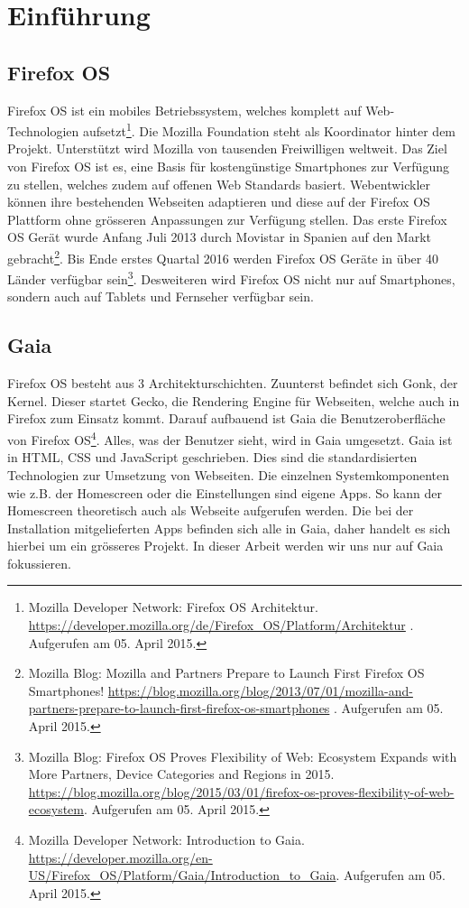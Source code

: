 \chapter{Einführung}

\section{Firefox OS}
Firefox OS ist ein mobiles Betriebssystem, welches komplett auf Web-Technologien aufsetzt\footnote{Mozilla Developer Network: Firefox OS Architektur. \url{https://developer.mozilla.org/de/Firefox_OS/Platform/Architektur} . Aufgerufen am 05. April 2015.}. Die Mozilla Foundation steht als Koordinator hinter dem Projekt. Unterstützt wird Mozilla von tausenden Freiwilligen weltweit. Das Ziel von Firefox OS ist es, eine Basis für kostengünstige Smartphones zur Verfügung zu stellen, welches zudem auf offenen Web Standards basiert. Webentwickler können ihre bestehenden Webseiten adaptieren und diese auf der Firefox OS Plattform ohne grösseren Anpassungen zur Verfügung stellen. Das erste Firefox OS Gerät wurde Anfang Juli 2013 durch Movistar in Spanien auf den Markt gebracht\footnote{Mozilla Blog: Mozilla and Partners Prepare to Launch First Firefox OS Smartphones! \url{https://blog.mozilla.org/blog/2013/07/01/mozilla-and-partners-prepare-to-launch-first-firefox-os-smartphones} . Aufgerufen am 05. April 2015.}. Bis Ende erstes Quartal 2016 werden Firefox OS Geräte in über 40 Länder verfügbar sein\footnote{Mozilla Blog: Firefox OS Proves Flexibility of Web: Ecosystem Expands with More Partners, Device Categories and Regions in 2015. \url{https://blog.mozilla.org/blog/2015/03/01/firefox-os-proves-flexibility-of-web-ecosystem}. Aufgerufen am 05. April 2015.}. Desweiteren wird Firefox OS nicht nur auf Smartphones, sondern auch auf Tablets und Fernseher verfügbar sein.

\section{Gaia}
Firefox OS besteht aus 3 Architekturschichten. Zuunterst befindet sich Gonk, der Kernel. Dieser startet Gecko, die Rendering Engine für Webseiten, welche auch in Firefox zum Einsatz kommt. Darauf aufbauend ist Gaia die Benutzeroberfläche von Firefox OS\footnote{Mozilla Developer Network: Introduction to Gaia. \url{https://developer.mozilla.org/en-US/Firefox_OS/Platform/Gaia/Introduction_to_Gaia}. Aufgerufen am 05. April 2015.}. Alles, was der Benutzer sieht, wird in Gaia umgesetzt. Gaia ist in HTML, CSS und JavaScript geschrieben. Dies sind die standardisierten Technologien zur Umsetzung von Webseiten. Die einzelnen Systemkomponenten wie z.B. der Homescreen oder die Einstellungen sind eigene Apps. So kann der Homescreen theoretisch auch als Webseite aufgerufen werden. Die bei der Installation mitgelieferten Apps befinden sich alle in Gaia, daher handelt es sich hierbei um ein grösseres Projekt. In dieser Arbeit werden wir uns nur auf Gaia fokussieren.

